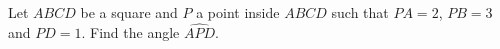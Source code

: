 Let $ABCD$ be a square and $P$ a point inside $ABCD$ such that $PA = 2$, $PB = 3$ and $PD = 1$. Find the angle $\widehat{APD}$.
